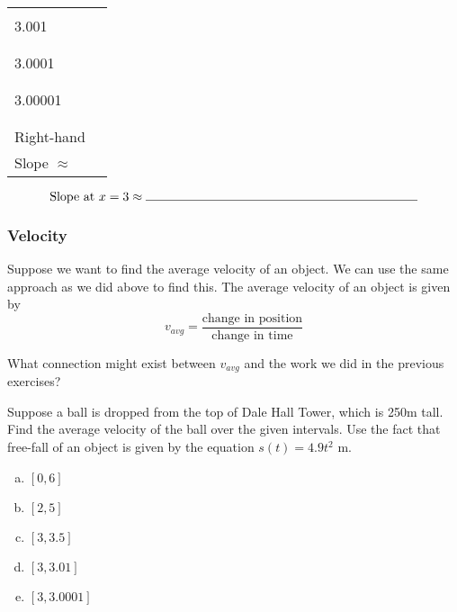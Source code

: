 \documentclass[notes]{subfiles}
\begin{document}
\begin{ex}
\begin{center}
\begin{minipage}{.45\textwidth}
\begin{tabu}{|X[c]|X[1.5,c]|}
								& \\
						3.001	& \\ 
								& \\ \hline
								& \\ 
						3.0001	& \\ 
								& \\ \hline
								& \\
						3.00001	&\\
								&\\ \hline\hline
								&\\
						Right-hand		& \\
						Slope $\approx$		&\\ \hline
					\end{tabu}
				\end{minipage}
				\[\text{Slope at  }x = 3\approx \makebox[3in]{\hrulefill}\]
					
			\end{center}					
		\end{ex}	
			\newpage
			
	\subsubsection*{Velocity}

		Suppose we want to find the average velocity of an object.  We can use the same approach as we did above to find this.  The average velocity of an object is given by
			\[v_{avg} = \dfrac{\text{change in position}}{\text{change in time}}\]
			
		\begin{question}
			What connection might exist between $v_{avg}$ and the work we did in the previous exercises?
		\end{question}
			
		\begin{ex}
			Suppose a ball is dropped from the top of Dale Hall Tower, which is 250m tall.  Find the average velocity of the ball over the given intervals.  Use the fact  that free-fall of an object is given by the equation $s(t) = 4.9t^2$ m.  
			\begin{enumerate}[(a)]
				\item $[0,6]$
					
				\item $[2,5]$
					
				\item $[3,3.5]$
					
				\item $[3,3.01]$
					
				\item $[3,3.0001]$
					
			\end{enumerate}
		\end{ex}
			\newpage
			
\end{document}
